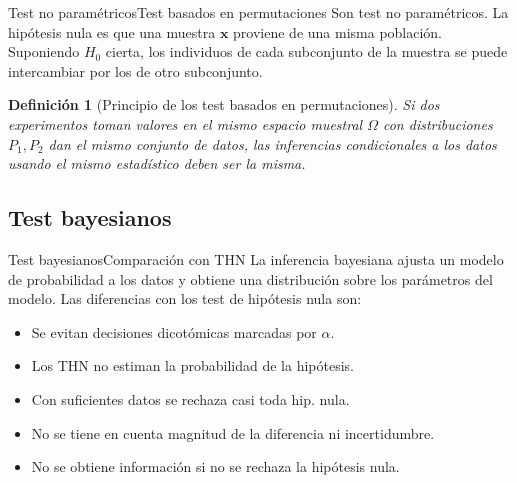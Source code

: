 \documentclass[leqno]{beamer}
\theoremstyle{definition_wo_parentheses}
\newtheorem{definicion}{Definición}
\begin{document}

\begin{frame}{Test no paramétricos}{Test basados en permutaciones}
	Son test no paramétricos. La hipótesis nula es que una muestra $\mathbf{x}$ proviene de una misma población.\\
	Suponiendo $H_0$ cierta, los individuos de cada 
subconjunto de la muestra se puede intercambiar por los de 
otro subconjunto.
\begin{definicion}[Principio de los test basados en permutaciones] Si dos experimentos toman valores en el mismo
espacio muestral $\Omega$ con distribuciones $P_1, P_2$ dan
el mismo conjunto de datos, las inferencias condicionales
a los datos usando el mismo estadístico deben ser la misma.
\end{definicion}
\end{frame}


\subsection{Test bayesianos}

\begin{frame}{Test bayesianos}{Comparación con THN}
	La inferencia bayesiana ajusta un modelo de probabilidad
a los datos y obtiene una distribución sobre los parámetros
del modelo. Las diferencias con los test de hipótesis nula son:

\begin{itemize}
\item Se evitan decisiones dicotómicas marcadas por $\alpha$.
\item Los THN no estiman la probabilidad de la hipótesis.
\item Con suficientes datos se rechaza casi toda hip. nula.
\item No se tiene en cuenta magnitud de la diferencia ni incertidumbre.
\item No se obtiene información si no se rechaza la hipótesis nula.
\end{itemize}

\end{frame}

\end{document}
